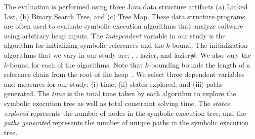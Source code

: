 The evaluation is performed using three Java data structure artifacts 
(a) Linked List,
(b) Binary Search Tree, and (c) Tree Map. 
These data structure
programs are often used to evaluate symbolic execution algorithms
that analyze software using arbitrary heap inputs. The \emph{independent} variable in our
study is the algorithm for initializing symbolic references and the
$k$-bound. The initialization algorithms that we vary in our study
are: \symtxt{}, \gsetxt{}, lazier, and lazier\#. We also vary the
$k$-bound for each of the algorithms. Note that $k$-bounding bounds the
length of a reference chain from the root of the heap~\cite{Deng:2006}.
We select three dependent variables and measures for our study: (i)
time, (ii) states explored, and (iii) paths generated. The \emph{time}
is the total time taken by each algorithm to explore the symbolic
execution tree as well as total constraint solving time. The
\emph{states explored} represents the number of nodes in the symbolic
execution tree, and the \emph{paths generated} represents 
the number of unique paths in the symbolic execution tree.


